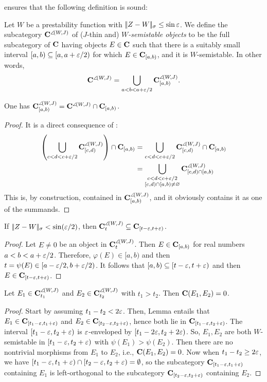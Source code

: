 \aprop {} ensures that the following definition is sound:
\begin{definition}\label{W.semistables}
Let $W$ be a prestability function with $|\!|Z-W|\!|_\sigma \le\sin\varepsilon$. We define the subcategory $\mathbf{C}^{\angle\!(W,J)}$ of ($J$\hyp{}thin and) \emph{$W$\hyp{}semistable objects} to be the full subcategory of $\mathbf{C}$ having objects $E\in \mathbf{C}$ such that there is a suitably small interval $[a,b)\subseteq [a,a+\varepsilon/2)$ for which $E\in\mathbf{C}_{[a,b)}$, and it is $W$\hyp{}semistable. In other words,
\[
\mathbf{C}^{\angle\!(W,J)}= \bigcup_{a<b<a+\varepsilon/2}\mathbf{C}^{\angle\!(W,J)}_{[a,b)}.
\]
\end{definition}
\begin{lemma}
One has $\mathbf{C}^{\angle\!(W,J)}_{[a,b)}=\mathbf{C}^{\angle\!(W,J)}\cap \mathbf{C}_{[a,b)}$.
\end{lemma}
\begin{proof}
It is a direct consequence of \aprop {}: 
\begin{align*}
\left(\bigcup_{c<d<c+\varepsilon/2} \mathbf{C}_{[c,d)}^{\angle\!(W,J)}\right)\cap \mathbf{C}_{[a,b)} &= \bigcup_{c<d<c+\varepsilon/2} \mathbf{C}_{[c,d)}^{\angle\!(W,J)} \cap \mathbf{C}_{[a,b)} \\
&= \bigcup_{\substack{c<d<c+\varepsilon/2 \\ [c,d)\cap [a,b)\neq \varnothing}} \mathbf{C}_{[c,d)\cap [a,b)}^{\angle\!(W,J)} 
\end{align*}
This is, by construction, contained in $\mathbf{C}^{\angle\!(W,J)}_{[a,b)}$, and it obviously contains it as one of the summands.
\end{proof}
\begin{lemma}\label{containment}
If $|\!|Z-W|\!|_\sigma< \sin(\varepsilon/2)$, then $\mathbf{C}^{\angle\!(W,J)}_t\subseteq \mathbf{C}_{[t-\varepsilon,t+\varepsilon)}$.
\end{lemma}
\begin{proof}
Let $E\neq 0$ be an object in $\mathbf{C}^{\angle\!(W,J)}_t$. Then $E\in \mathbf{C}_{[a,b)}$ for real numbers $a<b<a+\varepsilon/2$. Therefore, $\varphi(E)\in [a,b)$ and then $t=\psi(E)\in [a-\varepsilon/2,b+\varepsilon/2)$. It follows that $[a,b)\subseteq [t-\varepsilon,t+\varepsilon)$ and then $E\in \mathbf{C}_{[t-\varepsilon,t+\varepsilon)}$.
\end{proof}
\begin{proposition}
Let $E_1\in \mathbf{C}^{\angle\!(W,J)}_{t_1}$ and $E_2\in \mathbf{C}^{\angle\!(W,J)}_{t_2}$ with $t_1>t_2$. Then $\mathbf{C}(E_1,E_2)=0$.
\end{proposition}
\begin{proof}
Start by assuming $t_1-t_2<2\varepsilon$. Then, Lemma  entails that $E_1\in\mathbf{C}_{[t_1-\varepsilon,t_1+\varepsilon)}$ and $E_2\in\mathbf{C}_{[t_2-\varepsilon,t_2+\varepsilon)}$, hence both lie in $\mathbf{C}_{[t_1-\varepsilon,t_2+\varepsilon)}$. The interval $[t_1-\varepsilon,t_2+\varepsilon)$ is $\varepsilon$\hyp{}enveloped by $[t_1-2\varepsilon,t_2+2\varepsilon)$. 
So, $E_1, E_2$ are both $W$\hyp{}semistable in $[t_1-\varepsilon,t_2+\varepsilon)$ with $\psi(E_1)>\psi(E_2)$.  
Then there are no nontrivial morphisms from $E_1$ to $E_2$, i.e., 
$\mathbf{C}(E_1,E_2)=0$.
Now when $t_1-t_2\geq 2\varepsilon$, we have $[t_1-\varepsilon,t_1+\varepsilon)\cap [t_2-\varepsilon,t_2+\varepsilon)=\emptyset$, so the subcategory $\mathbf{C}_{[t_1-\varepsilon,t_1+\varepsilon)}$ containing $E_1$ is left\hyp{}orthogonal to the subcategory $\mathbf{C}_{[t_2-\varepsilon,t_2+\varepsilon)}$ containing $E_2$. 
\end{proof}
